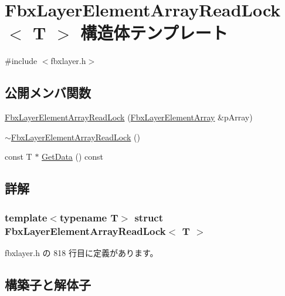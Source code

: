 \hypertarget{struct_fbx_layer_element_array_read_lock}{}\section{Fbx\+Layer\+Element\+Array\+Read\+Lock$<$ T $>$ 構造体テンプレート}
\label{struct_fbx_layer_element_array_read_lock}


{\ttfamily \#include $<$fbxlayer.\+h$>$}

\subsection*{公開メンバ関数}
\begin{DoxyCompactItemize}
\item 
\hyperlink{struct_fbx_layer_element_array_read_lock_a84d79db20cbfae99cc9fd44c66330f2d}{Fbx\+Layer\+Element\+Array\+Read\+Lock} (\hyperlink{class_fbx_layer_element_array}{Fbx\+Layer\+Element\+Array} \&p\+Array)
\item 
\hyperlink{struct_fbx_layer_element_array_read_lock_ab1e67ef56df73649cc41c66f88b29116}{$\sim$\+Fbx\+Layer\+Element\+Array\+Read\+Lock} ()
\item 
const T $\ast$ \hyperlink{struct_fbx_layer_element_array_read_lock_aad710280b9db22c282672ab5d193169d}{Get\+Data} () const
\end{DoxyCompactItemize}


\subsection{詳解}
\subsubsection*{template$<$typename T$>$\newline
struct Fbx\+Layer\+Element\+Array\+Read\+Lock$<$ T $>$}



 fbxlayer.\+h の 818 行目に定義があります。



\subsection{構築子と解体子}
\mbox{\label{struct_fbx_layer_element_array_read_lock_a84d79db20cbfae99cc9fd44c66330f2d}} 
